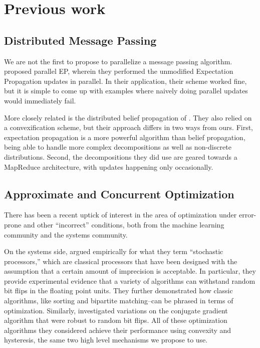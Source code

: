 \documentclass[12pt,leqno,twoside]{article}
\begin{document}
\section{Previous work}

\subsection{Distributed Message Passing}

We are not the first to propose to parallelize a message passing
algorithm. \citet{CsekeHeskes2010} proposed parallel EP, wherein
they performed the unmodified Expectation Propagation updates in
parallel. In their application, their scheme worked fine, but it
is simple to come up with examples where naively doing parallel
updates would immediately fail.

More closely related is the distributed belief propagation of
\citet{schwing2011distributed}.  They also relied on a convexification scheme, but
their approach differs in two ways from ours. First, expectation
propagation is a more powerful algorithm than belief propagation,
being able to handle more complex decompositions as well as
non-discrete distributions. Second, the decompositions they did use
are geared towards a MapReduce architecture, with updates happening
only occasionally. 

\subsection{Approximate and Concurrent Optimization}

There has been a recent uptick of interest in the area of optimization
under error-prone and other ``incorrect'' conditions, both from the
machine learning community and the systems community.

On the systems side, \citet{sartori11stochastic} argued empirically
for what they term ``stochastic processors,'' which are classical
processors that have been designed with the assumption that a certain
amount of imprecision is acceptable. In particular, they provide
experimental evidence that a variety of algorithms can withstand
random bit flips in the floating point units. They further demonstrated
how classic algorithms, like sorting and bipartite matching--can
be phrased in terms of optimization.  Similarly, \citet{oberil11numerical}
investigated variations on the conjugate gradient algorithm that
were robust to random bit flips. All of these optimization algorithms
they considered achieve their performance using convexity and
hysteresis, the same two high level mechanisms we propose to use.
\end{document}
